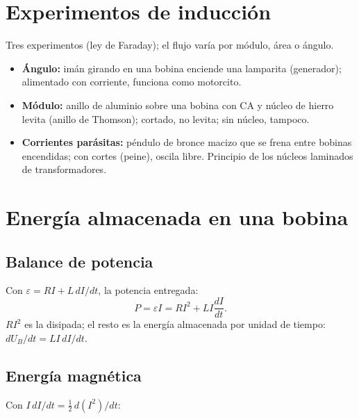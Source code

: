 \documentclass[12pt,a4paper]{article}
\begin{document}
\section{Experimentos de inducción}

Tres experimentos (ley de Faraday); el flujo varía por módulo, área o ángulo.

\begin{itemize}[nosep]
  \item \textbf{Ángulo:} imán girando en una bobina enciende una lamparita
        (generador); alimentado con corriente, funciona como motorcito.
  \item \textbf{Módulo:} anillo de aluminio sobre una bobina con CA y núcleo de
        hierro levita (anillo de Thomson); cortado, no levita; sin núcleo,
        tampoco.
  \item \textbf{Corrientes parásitas:} péndulo de bronce macizo que se frena
        entre bobinas encendidas; con cortes (peine), oscila libre. Principio de
        los núcleos laminados de transformadores.
\end{itemize}





\section{Energía almacenada en una bobina}

\subsection{Balance de potencia}

Con $\varepsilon = R I + L\,dI/dt$, la potencia entregada:
\[
P = \varepsilon I = R I^2 + L I \frac{dI}{dt}.
\]
$R I^2$ es la disipada; el resto es la energía almacenada por unidad de tiempo:
$dU_B/dt = L I\,dI/dt$.

\subsection{Energía magnética}

Con $I\,dI/dt = \tfrac12 \,d(I^2)/dt$:
\end{document}
